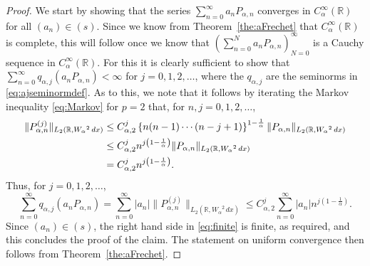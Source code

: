 \documentclass[12pt, reqno]{amsart}
\numberwithin{equation}{section}
\theoremstyle{plain}
\theoremstyle{definition}
\begin{document}
\begin{proof}
We start by showing that the series  $\sum_{n=0}^\infty a_n P_{\alpha,n}$ converges in ${{C_\alpha^\infty({{\mathbb R}})}}$ for all ${({a_n})}\in(s)$.  Since we know from Theorem~\ref{the:aFrechet} that ${{C_\alpha^\infty({{\mathbb R}})}}$ is complete, this will follow once we know that $\left(\sum_{n=0}^{N} a_n P_{\alpha,n}\right)_{N=0}^\infty$ is a Cauchy sequence in ${{C_\alpha^\infty({{\mathbb R}})}}$. For this it is clearly sufficient to show that $\sum_{n=0}^\infty {q_{\alpha, j}}(a_n P_{\alpha,n})<\infty$ for $j=0,1,2,\ldots$, where the ${q_{\alpha, j}}$ are the seminorms in \eqref{eq:ajseminormdef}. As to this, we note that it follows by iterating the Markov inequality \eqref{eq:Markov} for $p=2$ that, for $n,j=0,1,2,\ldots$,
\begin{align*}
\|P^{(j)}_{\alpha,n}\|_{{L_2({{\mathbb R}}, {W_\alpha}^2\,dx)}} & \leq C_{\alpha,2}^{j}\left\{n(n-1)\cdots(n-j+1)\right\}^{1-\frac{1}{\alpha}}\|P_{\alpha,n}\|_{{L_2({{\mathbb R}}, {W_\alpha}^2\,dx)}}\notag
\\ &\leq C_{\alpha,2}^{j}n^{j\left(1-\frac{1}{\alpha}\right)}\|P_{\alpha,n}\|_{{L_2({{\mathbb R}}, {W_\alpha}^2\,dx)}}\notag
\\ &= C_{\alpha,2}^{j}n^{j\left(1-\frac{1}{\alpha}\right)}.
\end{align*}
Thus, for $j=0,1,2,\ldots$,
\begin{equation}\label{eq:finite}
\sum_{n=0}^\infty {q_{\alpha, j}}(a_n P_{\alpha, n})=\sum_{n=0}^\infty |a_n|\|P_{\alpha,n}^{(j)}\|_{{L_2({{\mathbb R}}, {W_\alpha}^2\,dx)}} \leq C_{\alpha,2}^j\sum_{n=0}^\infty |a_n|n^{j\left(1-\frac{1}{\alpha}\right)}.
\end{equation}
Since ${({a_n})}\in(s)$, the right hand side in \eqref{eq:finite} is finite, as required, and this concludes the proof of the claim. The statement on uniform convergence then follows from Theorem~\ref{the:aFrechet}.


\end{proof}
\end{document}
